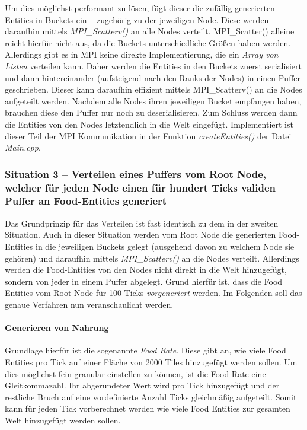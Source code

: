 \documentclass[course=erap]{aspdoc}
\begin{document}
Um dies möglichst performant zu lösen, fügt dieser die zufällig generierten Entities in Buckets ein -- zugehörig zu der jeweiligen Node. Diese werden daraufhin mittels \emph{MPI\_Scatterv()} an alle Nodes verteilt. MPI\_Scatter() alleine reicht hierfür nicht aus, da die Buckets unterschiedliche Größen haben werden. Allerdings gibt es in MPI keine direkte Implementierung, die ein \emph{Array von Listen} verteilen kann. Daher werden die Entities in den Buckets zuerst serialisiert und dann hintereinander (aufsteigend nach den Ranks der Nodes) in einen Puffer geschrieben. Dieser kann daraufhin effizient mittels MPI\_Scatterv() an die Nodes aufgeteilt werden. Nachdem alle Nodes ihren jeweiligen Bucket empfangen haben, brauchen diese den Puffer nur noch zu deserialisieren. Zum Schluss werden dann die Entities von den Nodes letztendlich in die Welt eingefügt. Implementiert ist dieser Teil der MPI Kommunikation in der Funktion \emph{createEntities()} der Datei \emph{Main.cpp}.


\subsubsection{Situation 3 -- Verteilen eines Puffers vom Root Node, welcher für jeden Node einen für hundert Ticks validen Puffer an Food-Entities generiert}
\label{subsubsec:mpi-situation-3}
Das Grundprinzip für das Verteilen ist fast identisch zu dem in der zweiten Situation. Auch in dieser Situation werden vom Root Node die generierten Food-Entities in die jeweiligen Buckets gelegt (ausgehend davon zu welchem Node sie gehören) und daraufhin mittels \emph{MPI\_Scatterv()} an die Nodes verteilt. Allerdings werden die Food-Entities von den Nodes nicht direkt in die Welt hinzugefügt, sondern von jeder in einem Puffer abgelegt. Grund hierfür ist, dass die Food Entities vom Root Node für 100 Ticks \emph{vorgeneriert} werden. Im Folgenden soll das genaue Verfahren nun veranschaulicht werden.


\paragraph{Generieren von Nahrung}
Grundlage hierfür ist die sogenannte \emph{Food Rate}. Diese gibt an, wie viele Food Entities pro Tick auf einer Fläche von 2000 Tiles hinzugefügt werden sollen. Um dies möglichst fein granular einstellen zu können, ist die Food Rate eine Gleitkommazahl. Ihr abgerundeter Wert wird pro Tick hinzugefügt und der restliche Bruch auf eine vordefinierte Anzahl Ticks gleichmäßig aufgeteilt. Somit kann für jeden Tick vorberechnet werden wie viele Food Entities zur gesamten Welt hinzugefügt werden sollen.
\end{document}

